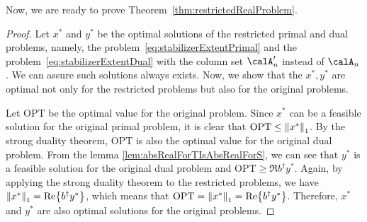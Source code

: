 \documentclass[\main/main]{subfiles}
\begin{document}
Now, we are ready to prove Theorem~\ref{thm:restrictedRealProblem}.

\restrictedRealProblem*
\begin{proof}
    Let $x^*$ and $y^*$ be the optimal solutions
    of the restricted primal and dual problems,
    namely, the problem~\eqref{eq:stabilizerExtentPrimal}
    and the problem~\eqref{eq:stabilizerExtentDual}
    with the column set $\calA'_n$ instead of $\calA_n$.
    We can assure such solutions always exists.
    Now, we show that the $x^*, y^*$ are
    optimal not only for the restricted problems
    but also for the original problems.

    Let $\mathrm{OPT}$ be the optimal value for the original problem.
    Since $x^*$ can be a feasible solution for the original primal problem,
    it is clear that $\mathrm{OPT} \leq \norm{x^*}_1$.
    By the strong duality theorem,
    $\mathrm{OPT}$ is also the optimal value
    for the original dual problem.
    From the lemma \ref{lem:absRealForTIsAbsRealForS},
    we can see that $y^*$ is a feasible solution
    for the original dual problem and $\mathrm{OPT} \geq \Re{b^\dagger y^*}$.
    Again, by applying the strong duality theorem
    to the restricted problems,
    we have $\norm{x^*}_1 = \Re{b^\dagger y^*}$,
    which means that $\mathrm{OPT} = \norm{x^*}_1 = \Re{b^\dagger y^*}$.
    Therefore, $x^*$ and $y^*$ are also optimal solutions
    for the original problems.
\end{proof}
\end{document}
